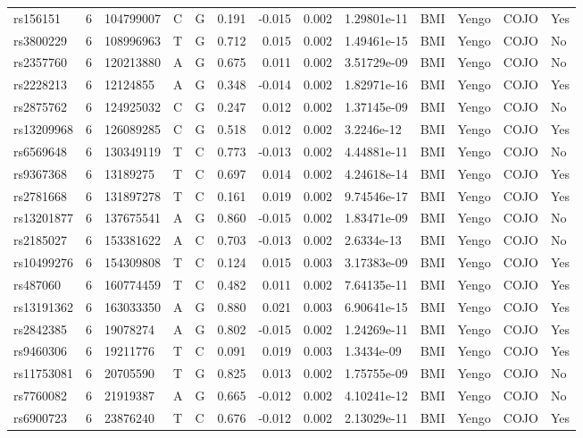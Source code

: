 \documentclass[11pt,twoside]{bristolthesis}
\begin{document}
\begin{longtable}[t]{lrlllrrrlllll}
\addlinespace
rs156151 & 6 & 104799007 & C & G & 0.191 & -0.015 & 0.002 & 1.29801e-11 & BMI & Yengo & COJO & Yes\\
rs3800229 & 6 & 108996963 & T & G & 0.712 & 0.015 & 0.002 & 1.49461e-15 & BMI & Yengo & COJO & No\\
rs2357760 & 6 & 120213880 & A & G & 0.675 & 0.011 & 0.002 & 3.51729e-09 & BMI & Yengo & COJO & No\\
rs2228213 & 6 & 12124855 & A & G & 0.348 & -0.014 & 0.002 & 1.82971e-16 & BMI & Yengo & COJO & Yes\\
rs2875762 & 6 & 124925032 & C & G & 0.247 & 0.012 & 0.002 & 1.37145e-09 & BMI & Yengo & COJO & No\\
\addlinespace
rs13209968 & 6 & 126089285 & C & G & 0.518 & 0.012 & 0.002 & 3.2246e-12 & BMI & Yengo & COJO & Yes\\
rs6569648 & 6 & 130349119 & T & C & 0.773 & -0.013 & 0.002 & 4.44881e-11 & BMI & Yengo & COJO & No\\
rs9367368 & 6 & 13189275 & T & C & 0.697 & 0.014 & 0.002 & 4.24618e-14 & BMI & Yengo & COJO & Yes\\
rs2781668 & 6 & 131897278 & T & C & 0.161 & 0.019 & 0.002 & 9.74546e-17 & BMI & Yengo & COJO & Yes\\
rs13201877 & 6 & 137675541 & A & G & 0.860 & -0.015 & 0.002 & 1.83471e-09 & BMI & Yengo & COJO & No\\
\addlinespace
rs2185027 & 6 & 153381622 & A & C & 0.703 & -0.013 & 0.002 & 2.6334e-13 & BMI & Yengo & COJO & No\\
rs10499276 & 6 & 154309808 & T & C & 0.124 & 0.015 & 0.003 & 3.17383e-09 & BMI & Yengo & COJO & Yes\\
rs487060 & 6 & 160774459 & T & C & 0.482 & 0.011 & 0.002 & 7.64135e-11 & BMI & Yengo & COJO & Yes\\
rs13191362 & 6 & 163033350 & A & G & 0.880 & 0.021 & 0.003 & 6.90641e-15 & BMI & Yengo & COJO & Yes\\
rs2842385 & 6 & 19078274 & A & G & 0.802 & -0.015 & 0.002 & 1.24269e-11 & BMI & Yengo & COJO & Yes\\
\addlinespace
rs9460306 & 6 & 19211776 & T & C & 0.091 & 0.019 & 0.003 & 1.3434e-09 & BMI & Yengo & COJO & Yes\\
rs11753081 & 6 & 20705590 & T & G & 0.825 & 0.013 & 0.002 & 1.75755e-09 & BMI & Yengo & COJO & No\\
rs7760082 & 6 & 21919387 & A & G & 0.665 & -0.012 & 0.002 & 4.10241e-12 & BMI & Yengo & COJO & No\\
rs6900723 & 6 & 23876240 & T & C & 0.676 & -0.012 & 0.002 & 2.13029e-11 & BMI & Yengo & COJO & Yes\\

\end{longtable}
\end{document}
